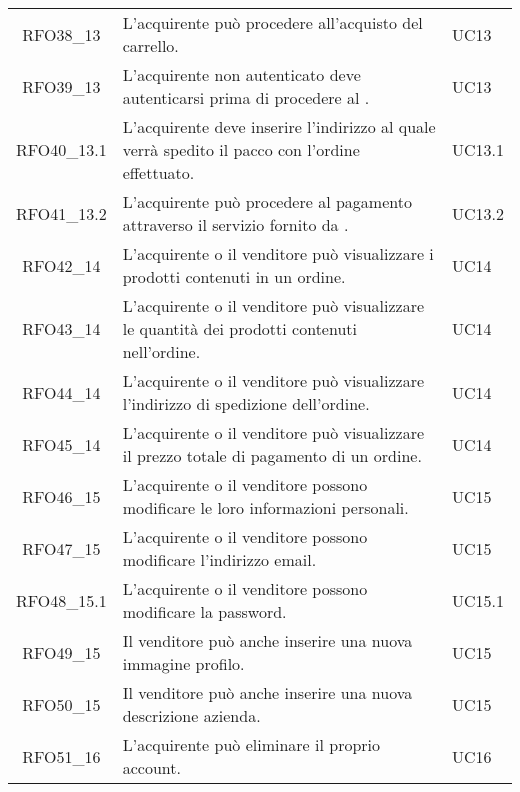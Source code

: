 \begin{longtable}{|c C{9.5cm} C{2.5cm}|}
    RFO38\_13 & L'acquirente può procedere all'acquisto del carrello. & UC13 \\
    
    RFO39\_13 & L'acquirente non autenticato deve autenticarsi prima di procedere al . & UC13 \\
    
    RFO40\_13.1 & L'acquirente deve inserire l'indirizzo al quale verrà spedito il pacco con l'ordine effettuato. & UC13.1 \\
    
    RFO41\_13.2 & L'acquirente può procedere al pagamento attraverso il servizio fornito da . & UC13.2 \\
    
    RFO42\_14 & L'acquirente o il venditore può visualizzare i prodotti contenuti in un ordine. & UC14 \\
    
    RFO43\_14 & L'acquirente o il venditore può visualizzare le quantità dei prodotti contenuti nell'ordine. & UC14 \\
    
    RFO44\_14 & L'acquirente o il venditore può visualizzare l’indirizzo di spedizione dell'ordine. & UC14 \\
    
    RFO45\_14 & L'acquirente o il venditore può visualizzare il prezzo totale di pagamento di un ordine. & UC14 \\
    
    RFO46\_15 & L'acquirente o il venditore possono modificare le loro informazioni personali. & UC15 \\
    
    RFO47\_15 & L'acquirente o il venditore possono modificare l'indirizzo email. & UC15 \\
    
    RFO48\_15.1 & L'acquirente o il venditore possono modificare la password. & UC15.1 \\
    
    RFO49\_15 & Il venditore può anche inserire una nuova immagine profilo. & UC15 \\
    
    RFO50\_15 & Il venditore può anche inserire una nuova descrizione azienda. & UC15 \\
    
    RFO51\_16 & L'acquirente può eliminare il proprio account. & UC16 \\
    

\end{longtable}
